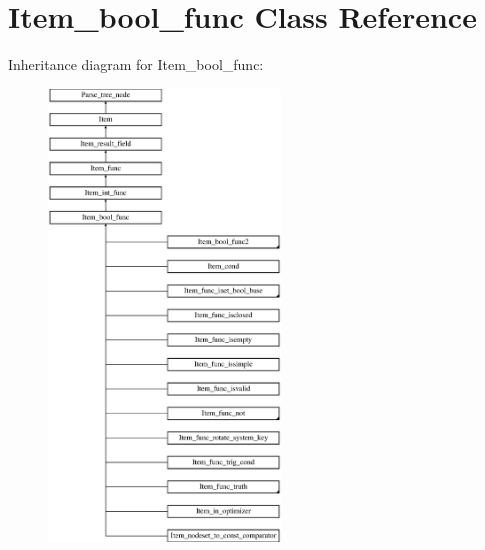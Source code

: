 \hypertarget{classItem__bool__func}{}\section{Item\+\_\+bool\+\_\+func Class Reference}
\label{classItem__bool__func}
Inheritance diagram for Item\+\_\+bool\+\_\+func\+:\begin{figure}[H]
\begin{center}
\leavevmode
\includegraphics[height=12.000000cm]{classItem__bool__func}
\end{center}
\end{figure}
